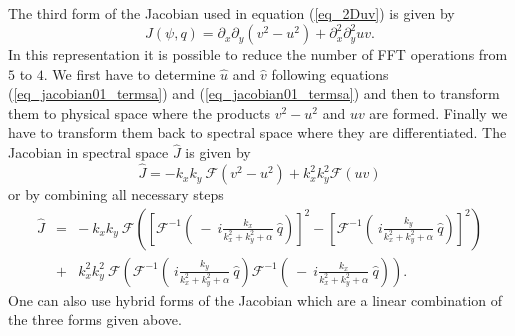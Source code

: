 The third form of the Jacobian used in equation (\ref{eq_2Duv}) is
given by
\begin{equation} \label{eq_jacobian03}
  J(\psi,q)
   = 
  \partial_{x}\partial_{y} \left(v^{2} - u^{2} \right)
   +
  \partial^{2}_{x} \partial^{2}_{y} uv.
\end{equation}
In this representation it is possible to reduce the number of FFT
operations from $5$ to $4$. We first have to determine $\hat{u}$ 
and $\hat{v}$ following equations (\ref{eq_jacobian01_termsa}) and 
(\ref{eq_jacobian01_termsa}) and then to transform them to physical 
space where the products $v^{2} - u^{2}$ and $uv$ are formed.
Finally we have to transform them back to spectral space where they
are differentiated. The Jacobian in spectral space $\hat{J}$ is 
given by   
\begin{equation} \label{eq_jacobian03_J}
  \hat{J}
   = 
  -k_{x}k_{y} \ \mathcal{F}(v^{2} - u^{2})
   +
   k^{2}_{x}k^{2}_{y} \mathcal{F}(uv)
\end{equation} 
or by combining all necessary steps
\begin{eqnarray} \nonumber
  \hat{J} 
   &=&
  - \ k_{x}k_{y} \ 
  \mathcal{F}
   \left(
    \left[ 
     \mathcal{F}^{-1} 
     \left(
      \ - \ i \frac{k_{x}}{k^{2}_{x}+k^{2}_{y}+\alpha} \ 
      \hat{q}
     \right) 
    \right]^{2}
       -
    \left[ 
     \mathcal{F}^{-1} 
      \left(
      \ i \frac{k_{y}}{k^{2}_{x}+k^{2}_{y}+\alpha} \ 
       \hat{q}
      \right) 
    \right]^{2}
   \right)
    \\ \label{eq_jacobian02_Jall}
   &+&
  k^{2}_{x} k^{2}_{y} \ 
  \mathcal{F}
   \left(
    \mathcal{F}^{-1} 
     \left(
     \ i \frac{k_{y}}{k^{2}_{x}+k^{2}_{y}+\alpha} \ 
      \hat{q}
     \right) 
    \mathcal{F}^{-1} 
     \left(
      \ - \ i \frac{k_{x}}{k^{2}_{x}+k^{2}_{y}+\alpha} \ 
      \hat{q}
     \right) 
   \right).
\end{eqnarray}
One can also use hybrid forms of the Jacobian which are a linear 
combination of the three forms given above.
%
